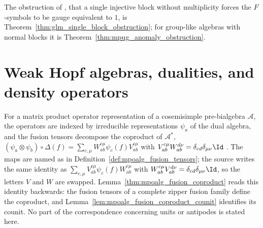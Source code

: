 The obstruction of \cite[Section~3.2]{GarreRubio2023MPOSym}, that a single
injective block without multiplicity forces the $F$-symbols to be gauge
equivalent to $1$, is Theorem~\ref{thm:glm_single_block_obstruction}; for
group-like algebras with normal blocks it is
Theorem~\ref{thm:mpug_anomaly_obstruction}.

\section{Weak Hopf algebras, dualities, and density operators}%
\label{sec:mpoalg_backbone}

\begin{remark}%
    \label{rem:mpoalg_weak_hopf}
    For a matrix product operator representation of a cosemisimple
    pre-bialgebra $\mathcal A$, the operators are indexed by irreducible
    representations $\psi_a$ of the dual algebra, and the fusion tensors
    decompose the coproduct of $\mathcal A^*$,
    $(\psi_a\otimes\psi_b)\circ\Delta(f)=\sum_{c,\mu}W_{ab}^{c\mu}\psi_c(f)
        V_{ab}^{c\mu}$ with $V_{ab}^{c\mu}W_{ab}^{d\nu}=
        \delta_{cd}\delta_{\mu\nu}\Id$ \cite[Section~4]{Molnar2022MPOAlgebrasI}.
    The maps are named as in Definition~\ref{def:mpoalg_fusion_tensors}; the
    source writes the same identity as $\sum_{c,\mu}V_{ab}^{c\mu}\psi_c(f)
        W_{ab}^{c\mu}$ with $W_{ab}^{c\mu}V_{ab}^{d\nu}=\delta_{cd}\delta_{\mu\nu}\Id$,
    so the letters $V$ and $W$ are swapped. Lemma~\ref{thm:mpoalg_fusion_coproduct}
    reads this identity backwards: the fusion tensors of a complete zipper
    fusion family define the coproduct, and
    Lemma~\ref{lem:mpoalg_fusion_coproduct_counit} identifies its counit. No
    part of the correspondence concerning units or antipodes is stated here.
\end{remark}

